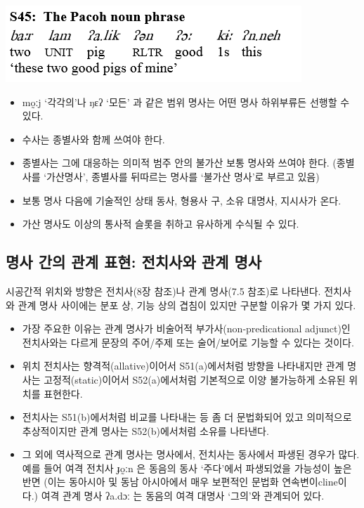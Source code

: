 \includegraphics{Pacoh/src/PacohS45.png}


\begin{itemize}
\item mo̰ːj `각각의'나 ŋɛʔ `모든' 과 같은 범위 명사는 어떤 명사 하위부류든 선행할 수 있다.
\item 수사는 종별사와 함께 쓰여야 한다.
\item 종별사는 그에 대응하는 의미적 범주 안의 불가산 보통 명사와 쓰여야 한다. (종별사를 `가산명사', 종별사를 뒤따르는 명사를 `불가산 명사'로 부르고 있음)
\item 보통 명사 다음에 기술적인 상태 동사, 형용사 구, 소유 대명사, 지시사가 온다.
\item 가산 명사도 이상의 통사적 슬롯을 취하고 유사하게 수식될 수 있다.
\end{itemize}

\subsection{명사 간의 관계 표현: 전치사와 관계 명사}
시공간적 위치와 방향은 전치사(8장 참조)나 관계 명사(7.5 참조)로 나타낸다. 전치사와 관계 명사 사이에는 분포 상, 기능 상의 겹침이 있지만 구분할 이유가 몇 가지 있다.
\begin{itemize}
\item 가장 주요한 이유는 관계 명사가 비술어적 부가사(non-predicational adjunct)인 전치사와는 다르게 문장의 주어/주제 또는 술어/보어로 기능할 수 있다는 것이다.
\item 위치 전치사는 향격적(allative)이어서 S51(a)에서처럼 방향을 나타내지만 관계 명사는 고정적(static)이어서 S52(a)에서처럼 기본적으로 이양 불가능하게 소유된 위치를 표현한다.
\item 전치사는 S51(b)에서처럼 비교를 나타내는 등 좀 더 문법화되어 있고 의미적으로 추상적이지만 관계 명사는 S52(b)에서처럼 소유를 나타낸다.
\item 그 외에 역사적으로 관계 명사는 명사에서, 전치사는 동사에서 파생된 경우가 많다. 예를 들어 여격 전치사 ɟo̰ːn 은 동음의 동사 `주다'에서 파생되었을 가능성이 높은 반면 (이는 동아시아 및 동남 아시아에서 매우 보편적인 문법화 연속변이cline이다.) 여격 관계 명사 ʔa.dɔː 는 동음의 여격 대명사 `그의'와 관계되어 있다.
\end{itemize}

